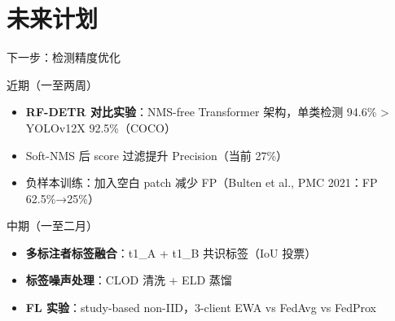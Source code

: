\documentclass[aspectratio=169, 10pt]{beamer}
\begin{document}
\section{未来计划}

\begin{frame}{下一步：检测精度优化}
  \begin{block}{近期（一至两周）}
    \begin{itemize}
      \item \textbf{RF-DETR 对比实验}：NMS-free Transformer 架构，单类检测 94.6\% > YOLOv12X 92.5\%（COCO）
      \item Soft-NMS 后 score 过滤提升 Precision（当前 27\%）
      \item 负样本训练：加入空白 patch 减少 FP（Bulten et al., PMC 2021：FP 62.5\%→25\%）
    \end{itemize}
  \end{block}
  \vspace{0em}
  \begin{block}{中期（一至二月）}
    \begin{itemize}
      \item \textbf{多标注者标签融合}：t1\_A + t1\_B 共识标签（IoU 投票）
      \item \textbf{标签噪声处理}：CLOD 清洗 + ELD 蒸馏
      \item \textbf{FL 实验}：study-based non-IID，3-client EWA vs FedAvg vs FedProx
    \end{itemize}
  \end{block}
\end{frame}
\end{document}
